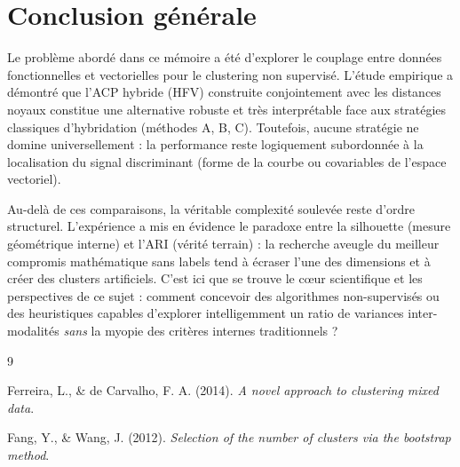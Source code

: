 \documentclass[11pt,a4paper]{article}
\begin{document}
\section{Conclusion générale}

Le problème abordé dans ce mémoire a été d'explorer le couplage entre données fonctionnelles et vectorielles pour le clustering non supervisé. L'étude empirique a démontré que l'ACP hybride (HFV) construite conjointement avec les distances noyaux constitue une alternative robuste et très interprétable face aux stratégies classiques d'hybridation (méthodes A, B, C). Toutefois, aucune stratégie ne domine universellement : la performance reste logiquement subordonnée à la localisation du signal discriminant (forme de la courbe ou covariables de l'espace vectoriel).

Au-delà de ces comparaisons, la véritable complexité soulevée reste d'ordre structurel. L'expérience a mis en évidence le paradoxe entre la silhouette (mesure géométrique interne) et l'ARI (vérité terrain) : la recherche aveugle du meilleur compromis mathématique sans labels tend à écraser l'une des dimensions et à créer des clusters artificiels. C'est ici que se trouve le cœur scientifique et les perspectives de ce sujet : comment concevoir des algorithmes non-supervisés ou des heuristiques capables d'explorer intelligemment un ratio de variances inter-modalités \emph{sans} la myopie des critères internes traditionnels ?

\begin{thebibliography}{9}

Ferreira, L., \& de Carvalho, F. A. (2014). \textit{A novel approach to clustering mixed data}.

Fang, Y., \& Wang, J. (2012). \textit{Selection of the number of clusters via the bootstrap method}.

\end{thebibliography}
\end{document}
